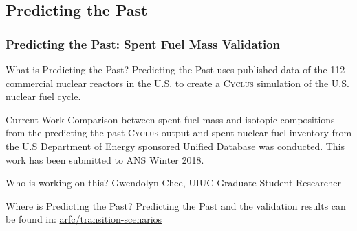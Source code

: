 \newcommand{\Cyclus}{\textsc{Cyclus}\xspace}%
\subsection{Predicting the Past}
\begin{frame}
  \frametitle{Predicting the Past: Spent Fuel Mass Validation}

\begin{block}{What is Predicting the Past? }
Predicting the Past uses published data of the 112 commercial nuclear reactors in the U.S. to create a \Cyclus simulation of the U.S. nuclear fuel cycle.
\end{block}

\begin{block}{Current Work}
Comparison between spent fuel mass and isotopic compositions from the predicting the past \Cyclus output and spent nuclear fuel inventory from the U.S Department of Energy sponsored Unified Database\cite{} was conducted. This work has been submitted to ANS Winter 2018.
\end{block}

\begin{block}{Who is working on this?}
Gwendolyn Chee, UIUC Graduate Student Researcher
\end{block}

\begin{block}{Where is Predicting the Past?}
Predicting the Past and the validation results can be found in: \href{https://github.com/arfc/transition-scenarios/tree/master/input/predicting-the-past}{arfc/transition-scenarios} 
\end{block}

\end{frame}